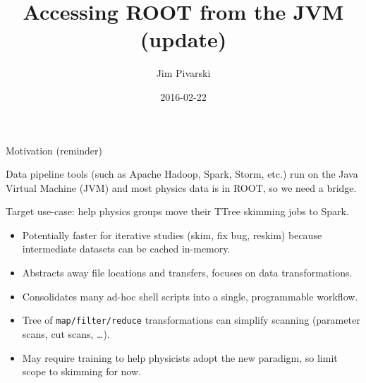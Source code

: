 \documentclass{beamer}
\title[2016-02-22-ROOT-JVM-afterhadoop]{Accessing ROOT from the JVM (update)}
\author{Jim Pivarski}
\date{2016-02-22}
\begin{document}
\begin{frame}
  \titlepage
\end{frame}


\begin{frame}{Motivation (reminder)}
\begin{block}{}
\vspace{-\baselineskip}
Data pipeline tools (such as Apache Hadoop, Spark, Storm, etc.) run on the Java Virtual Machine (JVM) and most physics data is in ROOT, so we need a bridge.
\end{block}

\begin{block}{}
\vspace{-\baselineskip}
Target use-case: help physics groups move their TTree skimming jobs to Spark.
\begin{itemize}
\item Potentially faster for iterative studies (skim, fix bug, reskim) because intermediate datasets can be cached in-memory.
\item Abstracts away file locations and transfers, focuses on data transformations.
\item Consolidates many ad-hoc shell scripts into a single, programmable workflow.
\item Tree of {\tt map/filter/reduce} transformations can simplify scanning (parameter scans, cut scans, \ldots).
\item May require training to help physicists adopt the new paradigm, so limit scope to skimming for now.
\end{itemize}
\end{block}
\end{frame}
\end{document}
